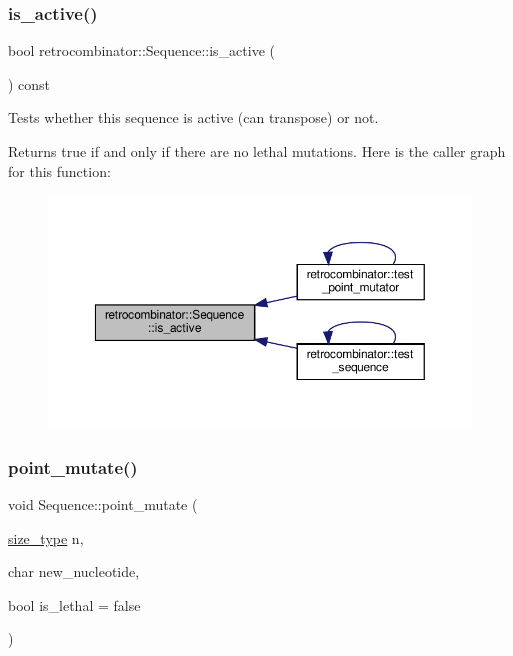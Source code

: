 \subsubsection{\texorpdfstring{is\+\_\+active()}{is\_active()}}
{\footnotesize\ttfamily bool retrocombinator\+::\+Sequence\+::is\+\_\+active (\begin{DoxyParamCaption}{ }\end{DoxyParamCaption}) const\hspace{0.3cm}{\ttfamily [inline]}}



Tests whether this sequence is active (can transpose) or not. 

Returns true if and only if there are no lethal mutations. Here is the caller graph for this function\+:
\nopagebreak
\begin{figure}[H]
\begin{center}
\leavevmode
\includegraphics[width=350pt]{classretrocombinator_1_1Sequence_a445120376c2e5c626d3ecfa509406843_icgraph}
\end{center}
\end{figure}
\mbox{\label{classretrocombinator_1_1Sequence_a85299c3dbf2efb993a43acc2e42fcb00}} 
\subsubsection{\texorpdfstring{point\+\_\+mutate()}{point\_mutate()}}
{\footnotesize\ttfamily void Sequence\+::point\+\_\+mutate (\begin{DoxyParamCaption}\item[{\hyperlink{constants_8h_a8e1541b50cee66a791df4c437ccbb385}{size\+\_\+type}}]{n,  }\item[{char}]{new\+\_\+nucleotide,  }\item[{bool}]{is\+\_\+lethal = {\ttfamily false} }\end{DoxyParamCaption})}



